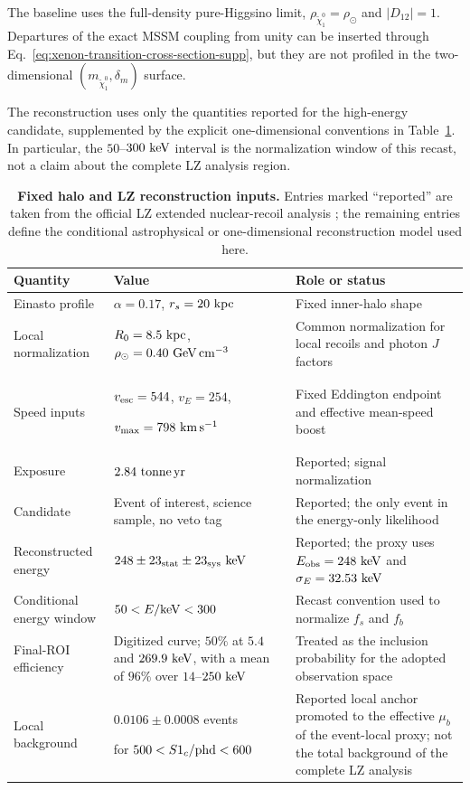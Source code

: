 \documentclass[%
  aps,
  prl,
  reprint,
  superscriptaddress,
  amsmath,
  amssymb,
  longbibliography
]{revtex4-2}
\begin{document}
The baseline uses the full-density pure-Higgsino limit,
\(\rho_{\widetilde\chi_1^0}=\rho_\odot\) and \(|D_{12}|=1\).  Departures of
the exact MSSM coupling from unity can be inserted through
Eq.~\eqref{eq:xenon-transition-cross-section-supp}, but they are not profiled
in the two-dimensional \((m_{\widetilde\chi_1^0},\delta_m)\) surface.

The reconstruction uses only the quantities reported for the high-energy
candidate, supplemented by the explicit one-dimensional conventions in
Table~\ref{tab:halo-lz-inputs-supp}.  In particular, the
\(50\)--\(300~{\rm keV}\) interval is the normalization window of this
recast, not a claim about the complete LZ analysis region.

\begin{table}[b]
 \caption{\textbf{Fixed halo and LZ reconstruction inputs.}  Entries marked
 ``reported'' are taken from the official LZ extended nuclear-recoil analysis
 \cite{LZ:2026HighEnergy}; the remaining entries define the conditional
 astrophysical or one-dimensional reconstruction model used here.}
 \label{tab:halo-lz-inputs-supp}
 \footnotesize
 \begin{ruledtabular}
 \begin{tabular}{@{}p{}p{}p{}@{}}
 Quantity & Value & Role or status\\
 \hline
 Einasto profile &
 \(\alpha=0.17\), \(r_s=20~{\rm kpc}\) &
 Fixed inner-halo shape\\
 Local normalization &
 \({R_0=8.5~{\rm kpc}}\),
 \({\rho_\odot=0.40~{\rm GeV\,cm^{-3}}}\) &
 Common normalization for local recoils and photon \(J\) factors\\
Speed inputs &
 \(v_{\rm esc}=544\), \(v_E=254\),\par
 \(v_{\max}=798~{\rm km\,s^{-1}}\) &
 Fixed Eddington endpoint and effective mean-speed boost\\
 Exposure &
 \(2.84~{\rm tonne\,yr}\) &
 Reported; signal normalization\\
 Candidate &
 Event of interest, science sample, no veto tag &
 Reported; the only event in the energy-only likelihood\\
 Reconstructed energy &
 \(248\pm23_{\rm stat}\pm23_{\rm sys}~{\rm keV}\) &
 Reported; the proxy uses \(E_{\rm obs}=248~{\rm keV}\) and
 \(\sigma_E=32.53~{\rm keV}\)\\
 Conditional energy window &
 \(50<E/{\rm keV}<300\) &
 Recast convention used to normalize \(f_s\) and \(f_b\)\\
 Final-ROI efficiency &
 Digitized curve; \(50\%\) at \(5.4\) and \(269.9~{\rm keV}\),
 with a mean of \(96\%\) over \(14\)--\(250~{\rm keV}\) &
 Treated as the inclusion probability for the adopted observation space\\
Local background &
 \(0.0106\pm0.0008\) events\par for
 \(500<S1_c/{\rm phd}<600\) &
 Reported local anchor promoted to the effective \(\mu_b\) of the event-local
 proxy; not the total background of the complete LZ analysis\\
 \end{tabular}
 \end{ruledtabular}
\end{table}
\end{document}

